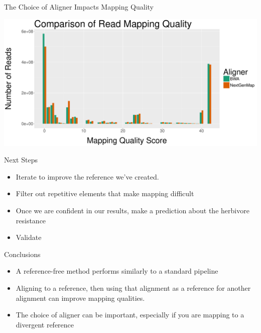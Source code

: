 \documentclass{beamer}
\begin{document}
\begin{frame}{The Choice of Aligner Impacts Mapping Quality}
\begin{center}
\includegraphics[width=.95\linewidth]{aligner_comparison_hist.pdf}
\end{center}
\end{frame}



\begin{frame}{Next Steps}
\begin{itemize}
\item Iterate to improve the reference we've created.
\item Filter out repetitive elements that make mapping difficult
\item Once we are confident in our results, make a prediction about the herbivore resistance
\item Validate
\end{itemize}
\end{frame}

\begin{frame}{Conclusions}
\begin{itemize}
\item A reference-free method performs similarly to a standard pipeline
\item Aligning to a reference, then using that alignment as a reference for another alignment can improve mapping qualities.
\item The choice of aligner can be important, especially if you are mapping to a divergent reference
\end{itemize}
\end{frame}
\end{document}
